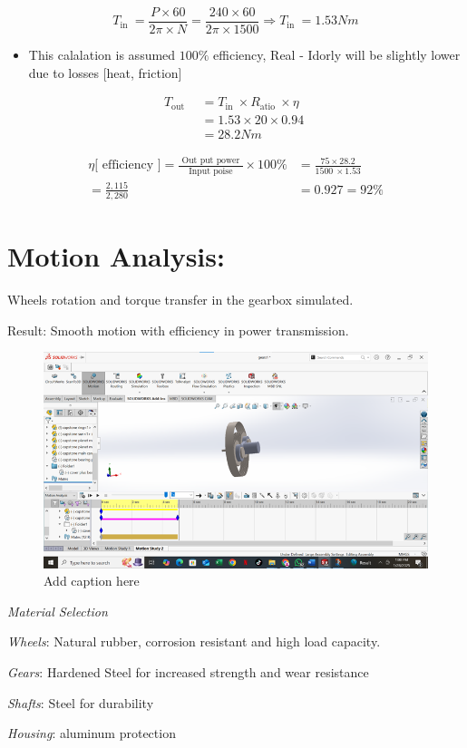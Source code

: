 \documentclass[../../main]{subfiles}
\begin{document}
\[T_{\text{in~}} = \frac{P \times 60}{2\pi \times N} = \frac{240 \times 60}{2\pi \times 1500} \Rightarrow T_{\text{in~}} = 1.53Nm\]

\begin{itemize}
\item
  This calalation is assumed \(100\%\) efficiency, Real - Idorly will be
  slightly lower due to losses {[}heat, friction{]}
\end{itemize}

\[\begin{aligned}
T_{\text{out~}}  \  &= T_{\text{in~}} \times R_{\text{atio~}} \times \eta\text{~~} \\
\  &= 1.53 \times 20 \times 0.94 \\
\  &= 28.2Nm
\end{aligned}\]

\[\begin{aligned}
\eta\lbrack\text{~efficiency~}\rbrack = \frac{\text{~Out put power~}}{\text{~Input poise~}} \times 100\% &= \frac{75 \times 28.2}{1500\  \times 1.53} \\
= \frac{2,115}{2,280} &= 0.927 = 92\%
\end{aligned}\]
\newpage


\section{Motion Analysis:}

Wheels\textquotesingle{} rotation and torque transfer in the gearbox
simulated.

Result: Smooth motion with efficiency in power transmission.
\begin{figure}[h]
  \centering
\includegraphics[]{sublatex/Opryrmi/media/image7.png}
\caption{Add caption here}
\end{figure}

\emph{Material Selection}

\emph{Wheels}: Natural rubber, corrosion resistant and high load capacity.

\emph{Gears}: Hardened Steel for increased strength and wear resistance

\emph{Shafts}: Steel for durability

\emph{Housing}: aluminum protection
\end{document}

